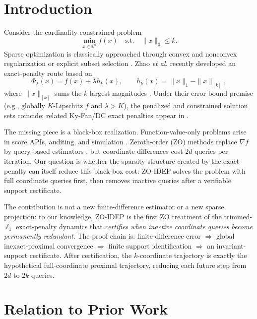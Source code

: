 \documentclass{article}
\newcommand{\R}{\mathbb{R}}
\begin{document}
\section{Introduction}
Consider the cardinality-constrained problem
\begin{equation}
    \min_{x\in\R^d} f(x) \quad \text{s.t.}\quad \|x\|_0\le k.
    \label{eq:l0}
\end{equation}
Sparse optimization is classically approached through convex and nonconvex regularization \cite{tibshirani1996lasso,fan2001variable,zhang2010mcp} or explicit subset selection \cite{bertsimas2016bestsubset}. Zhao \emph{et al.} recently developed an exact-penalty route based on
\begin{equation}
    \Phi_\lambda(x)=f(x)+\lambda h_k(x),\qquad
    h_k(x)=\|x\|_1-\|x\|_{[k]},
    \label{eq:penalty}
\end{equation}
where $\|x\|_{[k]}$ sums the $k$ largest magnitudes \cite{zhao2026exact}. Under their error-bound premise (e.g., globally $K$-Lipschitz $f$ and $\lambda>K$), the penalized and constrained solution sets coincide; related Ky-Fan/DC exact penalties appear in \cite{gotoh2018dc,yagishita2026exact}.

The missing piece is a black-box realization. Function-value-only problems arise in score APIs, auditing, and simulation \cite{chen2017zoo,vo2024brusle}. Zeroth-order (ZO) methods replace $\nabla f$ by query-based estimators \cite{nesterov2017random,ghadimi2013stochastic,duchi2015optimal,berahas2022comparison}, but coordinate differences cost $2d$ queries per iteration. Our question is whether the sparsity structure created by the exact penalty can itself reduce this black-box cost: ZO-IDEP solves the problem with full coordinate queries first, then removes inactive queries after a verifiable support certificate.

The contribution is not a new finite-difference estimator or a new sparse projection: to our knowledge, ZO-IDEP is the first ZO treatment of the trimmed-$\ell_1$ exact-penalty dynamics that \emph{certifies when inactive coordinate queries become permanently redundant}. The proof chain is: finite-difference error $\Rightarrow$ global inexact-proximal convergence $\Rightarrow$ finite support identification $\Rightarrow$ an invariant-support certificate. After certification, the $k$-coordinate trajectory is exactly the hypothetical full-coordinate proximal trajectory, reducing each future step from $2d$ to $2k$ queries.

\section{Relation to Prior Work}
\end{document}
